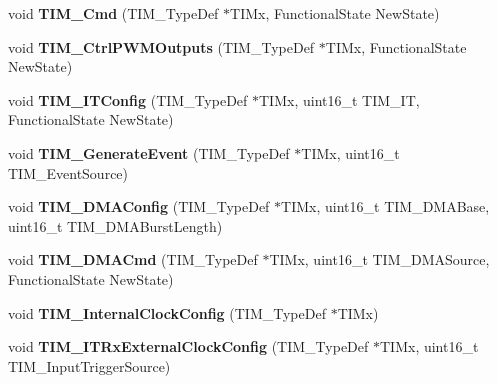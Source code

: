\begin{DoxyCompactItemize}
\item 
\hypertarget{group__TIM__Exported__Functions_ga2bdc275bcbd2ce9d1ba632e6c89896b7}{
void {\bfseries TIM\_\-Cmd} (TIM\_\-TypeDef $\ast$TIMx, FunctionalState NewState)}
\label{group__TIM__Exported__Functions_ga2bdc275bcbd2ce9d1ba632e6c89896b7}

\item 
\hypertarget{group__TIM__Exported__Functions_ga3e59ebced2ab8e0b817c460f1670e97d}{
void {\bfseries TIM\_\-CtrlPWMOutputs} (TIM\_\-TypeDef $\ast$TIMx, FunctionalState NewState)}
\label{group__TIM__Exported__Functions_ga3e59ebced2ab8e0b817c460f1670e97d}

\item 
\hypertarget{group__TIM__Exported__Functions_ga70e3d6c09d55ee69002e154c85cd40e4}{
void {\bfseries TIM\_\-ITConfig} (TIM\_\-TypeDef $\ast$TIMx, uint16\_\-t TIM\_\-IT, FunctionalState NewState)}
\label{group__TIM__Exported__Functions_ga70e3d6c09d55ee69002e154c85cd40e4}

\item 
\hypertarget{group__TIM__Exported__Functions_ga38bd4ffda920dd4f7655a0a2c6100a6e}{
void {\bfseries TIM\_\-GenerateEvent} (TIM\_\-TypeDef $\ast$TIMx, uint16\_\-t TIM\_\-EventSource)}
\label{group__TIM__Exported__Functions_ga38bd4ffda920dd4f7655a0a2c6100a6e}

\item 
\hypertarget{group__TIM__Exported__Functions_gad7156f84c436c8ac92cd789611826d09}{
void {\bfseries TIM\_\-DMAConfig} (TIM\_\-TypeDef $\ast$TIMx, uint16\_\-t TIM\_\-DMABase, uint16\_\-t TIM\_\-DMABurstLength)}
\label{group__TIM__Exported__Functions_gad7156f84c436c8ac92cd789611826d09}

\item 
\hypertarget{group__TIM__Exported__Functions_ga24700389cfa3ea9b42234933b23f1399}{
void {\bfseries TIM\_\-DMACmd} (TIM\_\-TypeDef $\ast$TIMx, uint16\_\-t TIM\_\-DMASource, FunctionalState NewState)}
\label{group__TIM__Exported__Functions_ga24700389cfa3ea9b42234933b23f1399}

\item 
\hypertarget{group__TIM__Exported__Functions_ga2394f0221709c0659874f9a4184cf86e}{
void {\bfseries TIM\_\-InternalClockConfig} (TIM\_\-TypeDef $\ast$TIMx)}
\label{group__TIM__Exported__Functions_ga2394f0221709c0659874f9a4184cf86e}

\item 
\hypertarget{group__TIM__Exported__Functions_gabef227d21d9e121e6a4ec5ab6223f5a9}{
void {\bfseries TIM\_\-ITRxExternalClockConfig} (TIM\_\-TypeDef $\ast$TIMx, uint16\_\-t TIM\_\-InputTriggerSource)}
\label{group__TIM__Exported__Functions_gabef227d21d9e121e6a4ec5ab6223f5a9}


\end{DoxyCompactItemize}
